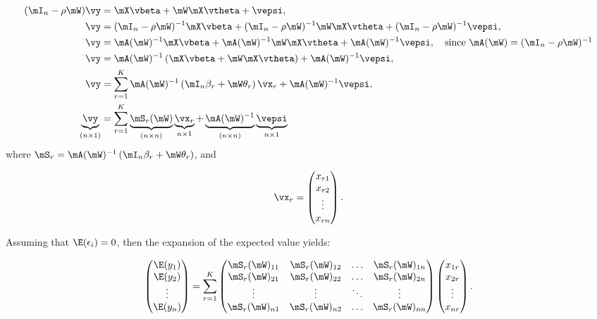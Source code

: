 \documentclass[english,12pt]{book}\usepackage[]{graphicx}\usepackage[]{xcolor}
\begin{document}
\begin{equation*}
\begin{aligned}
(\mI_n - \rho\mW)\vy & = \mX\vbeta + \mW\mX\vtheta + \vepsi, \\
\vy & =   (\mI_n - \rho\mW)^{-1}\mX\vbeta + (\mI_n - \rho\mW)^{-1}\mW\mX\vtheta + (\mI_n - \rho\mW)^{-1}\vepsi, \\
\vy & =   \mA(\mW)^{-1}\mX\vbeta + \mA(\mW)^{-1}\mW\mX\vtheta + \mA(\mW)^{-1}\vepsi,\quad \mbox{since $\mA(\mW) = (\mI_n - \rho\mW)^{-1}$}\\
\vy & =   \mA(\mW)^{-1}\left(\mX\vbeta + \mW\mX\vtheta\right) + \mA(\mW)^{-1}\vepsi, \\
\vy & =   \sum_{r=1}^K\mA(\mW)^{-1}\left(\mI_n\beta_r + \mW\theta_r\right)\vx_r + \mA(\mW)^{-1}\vepsi, \\
\underbrace{\vy}_{(n\times 1)} & =   \sum_{r=1}^K\underbrace{\mS_r(\mW)}_{(n\times n)}\underbrace{\vx_r}_{n\times 1} + \underbrace{\mA(\mW)^{-1}}_{(n\times n)}\underbrace{\vepsi}_{n\times 1}
\end{aligned}
\end{equation*}
%
where $\mS_r = \mA(\mW)^{-1}\left(\mI_n\beta_r + \mW\theta_r\right)$, and

\begin{equation*}
 \vx_r = \begin{pmatrix}
          x_{r1} \\
          x_{r2} \\
          \vdots \\
          x_{rn}
        \end{pmatrix}.
\end{equation*}

Assuming that $\E(\epsilon_i) = 0$, then the expansion of the expected value yields:

\begin{equation}\label{eq:system_expected}
\begin{pmatrix}
\E(y_1) \\ \E(y_2) \\ \vdots \\ \E(y_n)
\end{pmatrix}
=
\sum_{r=1}^K\begin{pmatrix}
\mS_r(\mW)_{11} & \mS_r(\mW)_{12} & \hdots & \mS_r(\mW)_{1n} \\
\mS_r(\mW)_{21} & \mS_r(\mW)_{22} & \hdots & \mS_r(\mW)_{2n} \\
\vdots & \vdots & \ddots & \vdots \\ 
\mS_r(\mW)_{n1} & \mS_r(\mW)_{n2} & \hdots & \mS_r(\mW)_{nn} 
\end{pmatrix}
\begin{pmatrix}
x_{1r} \\ x_{2r} \\ \vdots \\ x_{nr} 
\end{pmatrix}.
\end{equation}
\end{document}
